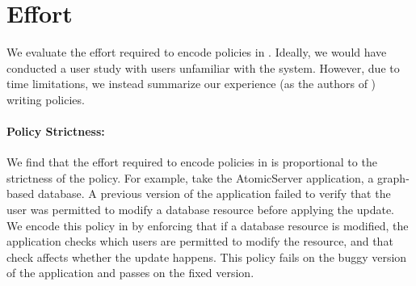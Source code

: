 \section{Effort}
\label{sec:accessibility}

We evaluate the effort required to encode policies in \syslang{}.
%
Ideally, we would have conducted a user study with users unfamiliar with the system.
%
However, due to time limitations, we instead summarize our experience (as the authors of \sys{}) writing policies.
%

\paragraph{Policy Strictness:} We find that the effort required to encode policies in \syslang{} is proportional to the strictness of the policy.
%
For example, take the AtomicServer application, a graph-based database.
%
A previous version of the application failed to verify that the 
user was permitted to modify a database resource before applying the update.
%
%
%
%
We encode this policy in \syslang{} by enforcing that if a database resource is modified,
the application checks which users are permitted to modify the resource,
and that check affects whether the update happens.
%
This policy fails on the buggy version of the application and passes on the fixed version.

